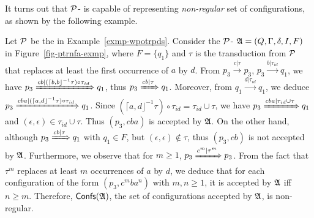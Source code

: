 It turns out that ${\mathcal{P} }$-{\WOTrNFA} is capable of representing \emph{non-regular} set of configurations, as %
shown by the following example.
\begin{example}
Let ${\mathcal{P} }$ be the {\WOTrPDS} in Example~\ref{exmp-wpotrpds}. Consider the ${\mathcal{P} }$-{\WOTrNFA} ${\mathfrak{A} } = (Q, \Gamma, \delta, I, F)$ in Figure~\ref{fig-ptrnfa-exmp}, where $F= \{q_1\}$ and $\tau$ is the transduction from ${\mathcal{P} }$ that replaces at least the first occurrence of $a$ by $d$. From $p_3 \xrightarrow{c | \tau} p_3$, $p_3 \xrightarrow{b | \tau_{id}} q_1$, we have $p_3  \xRightarrow{c b | (\lceil b, b\rfloor^{-1} \tau) \circ \tau_{id}} q_1$, thus $p_3 \xRightarrow{cb | \tau} q_1$. Moreover, from $q_1 \xrightarrow{d | \tau_{id}} q_1$, we deduce $p_3 \xRightarrow{c b a | (\lceil a, d\rfloor^{-1} \tau) \circ \tau_{id}} q_1$. Since $(\lceil a, d\rfloor^{-1} \tau) \circ \tau_{id} = \tau_{id} \cup \tau$, we have $p_3 \xRightarrow{c b a |  \tau_{id} \cup \tau} q_1$ and $(\epsilon, \epsilon) \in \tau_{id} \cup \tau$. Thus $(p_3, cba)$ is accepted by ${\mathfrak{A} }$. On the other hand, although $p_3 \xRightarrow{cb | \tau} q_1$ with $q_1 \in F$, but $(\epsilon, \epsilon) \not \in \tau$, thus $(p_3, cb)$ is not accepted by ${\mathfrak{A} }$.  Furthermore, we observe that for $m \ge 1$, $p_3 \xRightarrow{c^m | \tau^m} p_3$. From the fact that $\tau^m$ replaces at least $m$ occurrences of $a$ by $d$, we deduce that for each configuration of the form $(p_3, c^m b a^n)$ with $m,n \ge 1$, it is accepted by ${\mathfrak{A} }$ iff $n \ge m$.  Therefore, ${\mathsf{Confs} }({\mathfrak{A} })$, the set of configurations accepted by ${\mathfrak{A} }$, is non-regular. 
%
\begin{figure}[htb]
    \centering

\end{figure}
\end{example}
